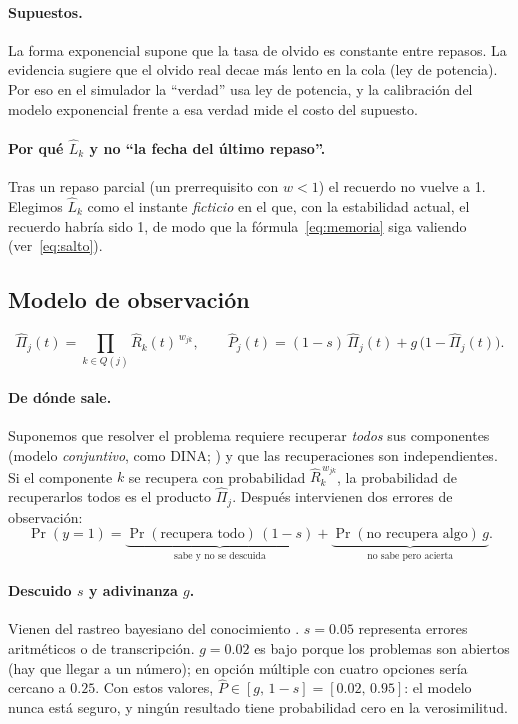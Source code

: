 \documentclass[11pt]{article}
\theoremstyle{definition}
\theoremstyle{remark}
\newcommand{\Rh}{\hat R}
\newcommand{\Lh}{\hat L}
\newcommand{\Pih}{\hat\Pi}
\begin{document}
\paragraph{Supuestos.} La forma exponencial supone que la tasa de olvido es constante entre repasos. La evidencia sugiere que el olvido real decae más lento en la cola (ley de potencia). Por eso en el simulador la ``verdad'' usa ley de potencia, y la calibración del modelo exponencial frente a esa verdad mide el costo del supuesto.

\paragraph{Por qué $\Lh_k$ y no ``la fecha del último repaso''.} Tras un repaso parcial (un prerrequisito con $w<1$) el recuerdo no vuelve a 1. Elegimos $\Lh_k$ como el instante \emph{ficticio} en el que, con la estabilidad actual, el recuerdo habría sido 1, de modo que la fórmula~\eqref{eq:memoria} siga valiendo (ver~\eqref{eq:salto}).

\subsection{Modelo de observación}
\label{sec:observacion}

\begin{equation}
\Pih_j(t)=\prod_{k\in Q(j)}\Rh_k(t)^{\,w_{jk}},\qquad
\hat P_j(t)=(1-s)\,\Pih_j(t)+g\,\bigl(1-\Pih_j(t)\bigr).
\label{eq:observacion}
\end{equation}

\paragraph{De dónde sale.} Suponemos que resolver el problema requiere recuperar \emph{todos} sus componentes (modelo \emph{conjuntivo}, como DINA; \citealp{junker2001}) y que las recuperaciones son independientes. Si el componente $k$ se recupera con probabilidad $\Rh_k^{\,w_{jk}}$, la probabilidad de recuperarlos todos es el producto $\Pih_j$. Después intervienen dos errores de observación:
\[
\Pr(y=1)=\underbrace{\Pr(\text{recupera todo})\,(1-s)}_{\text{sabe y no se descuida}}+\underbrace{\Pr(\text{no recupera algo})\,g}_{\text{no sabe pero acierta}}.
\]

\paragraph{Descuido $s$ y adivinanza $g$.} Vienen del rastreo bayesiano del conocimiento \citep{corbett1994}. $s=0.05$ representa errores aritméticos o de transcripción. $g=0.02$ es bajo porque los problemas son abiertos (hay que llegar a un número); en opción múltiple con cuatro opciones sería cercano a $0.25$. Con estos valores, $\hat P\in[g,\,1-s]=[0.02,\,0.95]$: el modelo nunca está seguro, y ningún resultado tiene probabilidad cero en la verosimilitud.
\end{document}
